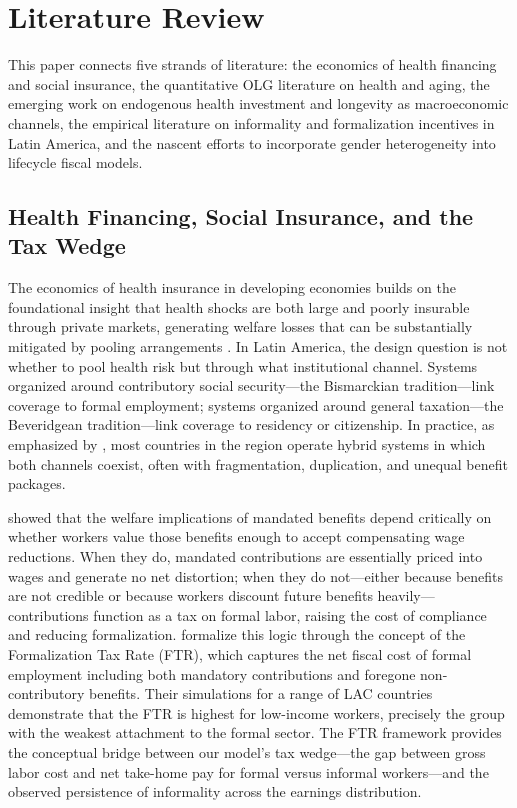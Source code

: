 \documentclass[12pt,a4paper]{article}
\begin{document}
\section{Literature Review}
\label{sec:lit}

This paper connects five strands of literature: the economics of health financing and social insurance, the quantitative OLG literature on health and aging, the emerging work on endogenous health investment and longevity as macroeconomic channels, the empirical literature on informality and formalization incentives in Latin America, and the nascent efforts to incorporate gender heterogeneity into lifecycle fiscal models.

\subsection{Health Financing, Social Insurance, and the Tax Wedge}
\label{subsec:lit_health}

The economics of health insurance in developing economies builds on the foundational insight that health shocks are both large and poorly insurable through private markets, generating welfare losses that can be substantially mitigated by pooling arrangements \citep{Arrow1963}. In Latin America, the design question is not whether to pool health risk but through what institutional channel. Systems organized around contributory social security---the Bismarckian tradition---link coverage to formal employment; systems organized around general taxation---the Beveridgean tradition---link coverage to residency or citizenship. In practice, as emphasized by \citet{Levy2008}, most countries in the region operate hybrid systems in which both channels coexist, often with fragmentation, duplication, and unequal benefit packages.

\citet{Summers1989} showed that the welfare implications of mandated benefits depend critically on whether workers value those benefits enough to accept compensating wage reductions. When they do, mandated contributions are essentially priced into wages and generate no net distortion; when they do not---either because benefits are not credible or because workers discount future benefits heavily---contributions function as a tax on formal labor, raising the cost of compliance and reducing formalization. \citet{WorldBankInformalizing2025} formalize this logic through the concept of the Formalization Tax Rate (FTR), which captures the net fiscal cost of formal employment including both mandatory contributions and foregone non-contributory benefits. Their simulations for a range of LAC countries demonstrate that the FTR is highest for low-income workers, precisely the group with the weakest attachment to the formal sector. The FTR framework provides the conceptual bridge between our model's tax wedge---the gap between gross labor cost and net take-home pay for formal versus informal workers---and the observed persistence of informality across the earnings distribution.
\end{document}
